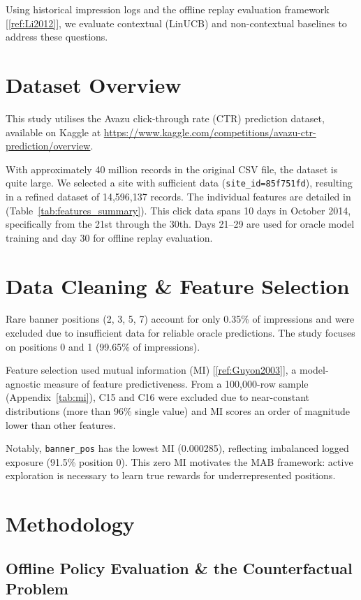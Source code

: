 \documentclass[12pt]{article}
\begin{document}
Using historical impression logs and the offline replay evaluation framework [\ref{ref:Li2012}], we evaluate contextual (LinUCB) and non-contextual baselines to address these questions.

\section{Dataset Overview}

This study utilises the Avazu click-through rate (CTR) prediction dataset, available on Kaggle at \url{https://www.kaggle.com/competitions/avazu-ctr-prediction/overview}.

With approximately 40 million records in the original CSV file, the dataset is quite large. We selected a site with sufficient data (\texttt{site\_id=85f751fd}), resulting in a refined dataset of 14,596,137 records. The individual features are detailed in (Table~\ref{tab:features_summary}). This click data spans 10 days in October 2014, specifically from the 21st through the 30th. Days 21--29 are used for oracle model training and day 30 for offline replay evaluation.

\section{Data Cleaning \& Feature Selection}

Rare banner positions (2, 3, 5, 7) account for only 0.35\% of impressions and were excluded due to insufficient data for reliable oracle predictions. The study focuses on positions 0 and 1 (99.65\% of impressions).

Feature selection used mutual information (MI) [\ref{ref:Guyon2003}], a model-agnostic measure of feature predictiveness. From a 100,000-row sample (Appendix~\ref{tab:mi}), C15 and C16 were excluded due to near-constant distributions (more than 96\% single value) and MI scores an order of magnitude lower than other features.

Notably, \texttt{banner\_pos} has the lowest MI (0.000285), reflecting imbalanced logged exposure (91.5\% position 0). This zero MI motivates the MAB framework: active exploration is necessary to learn true rewards for underrepresented positions.

\section{Methodology}

\subsection{Offline Policy Evaluation \& the Counterfactual Problem}
\end{document}
